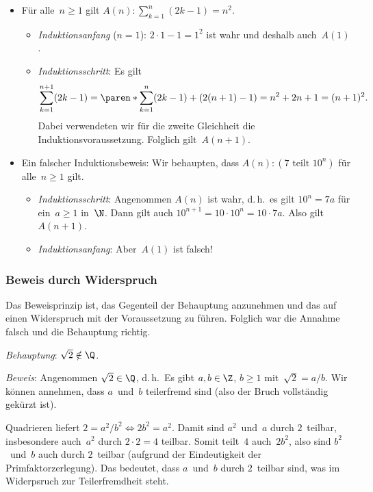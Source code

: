 \documentclass[a4paper]{article}
\begin{document}
\begin{example}\leavevmode
    \begin{itemize}
        \item Für alle~$n \geq 1$ gilt $A(n)\colon \sum_{k=1}^n (2k-1) = n^2$.
              \begin{itemize}
                  \item \emph{Induktionsanfang} ($n = 1$): $2 \cdot 1 - 1 = 1^2$ ist wahr und deshalb auch~$A(1)$.
                  \item \emph{Induktionsschritt}: Es gilt
                        \begin{equation*}
                            \sum_{k=1}^{n+1} (2k-1) = \paren*{\sum_{k=1}^n (2k-1)} + (2(n+1) - 1) = n^2 + 2n + 1 = (n+1)^2.
                        \end{equation*}
                        Dabei verwendeten wir für die zweite Gleichheit die Induktionsvoraussetzung. Folglich gilt~$A(n+1)$.
              \end{itemize}
        \item Ein falscher Induktionsbeweis: Wir behaupten, dass $A(n)\colon (7 \text{ teilt } 10^n)$ für alle~$n \geq 1$ gilt.
              \begin{itemize}
                  \item \emph{Induktionsschritt}: Angenommen $A(n)$ ist wahr, d.\,h.\ es gilt $10^n = 7a$ für ein~$a \geq 1$ in~$\N$. Dann gilt auch $10^{n+1} = 10 \cdot 10^n = 10 \cdot 7a$. Also gilt~$A(n+1)$.
                  \item \emph{Induktionsanfang}: Aber~$A(1)$ ist falsch!
              \end{itemize}
    \end{itemize}
\end{example}

\subsubsection{Beweis durch Widerspruch}

Das Beweisprinzip ist, das Gegenteil der Behauptung anzunehmen und das auf einen Widerspruch mit der Voraussetzung zu führen. Folglich war die Annahme falsch und die Behauptung richtig.

\begin{example}
    \emph{Behauptung}: $\sqrt{2} \notin \Q$.

    \emph{Beweis}: Angenommen $\sqrt{2} \in \Q$, d.\,h.\ Es gibt $a, b \in \Z$, $b \geq 1$ mit~$\sqrt{2} = a/b$. Wir können annehmen, dass $a$~und~$b$ teilerfremd sind (also der Bruch vollständig gekürzt ist).

    Quadrieren liefert $2 = a^2/b^2 \iff 2b^2 = a^2$. Damit sind $a^2$~und~$a$ durch $2$~teilbar, insbesondere auch~$a^2$ durch $2\cdot2 = 4$ teilbar. Somit teilt~$4$ auch~$2b^2$, also sind $b^2$~und~$b$ auch durch $2$~teilbar (aufgrund der Eindeutigkeit der Primfaktorzerlegung). Das bedeutet, dass $a$~und~$b$ durch $2$~teilbar sind, was im Widerpsruch zur Teilerfremdheit steht.
\end{example}
\end{document}
